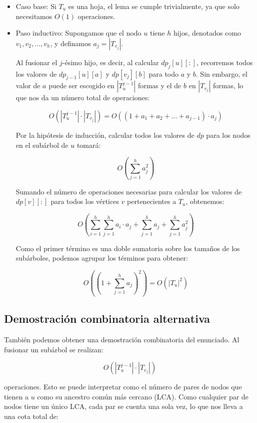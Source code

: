 \begin{itemize}
    \item Caso base: Si $T_u$ es una hoja, el lema se cumple trivialmente, ya que solo necesitamos $O(1)$ operaciones.
    \item Paso inductivo: Supongamos que el nodo $u$ tiene $h$ hijos, denotados como $v_1, v_2, \dots, v_h$, y definamos $a_j = |T_{v_j}|$.
    
    Al fusionar el $j$-ésimo hijo, es decir, al calcular $dp_j[u][:]$, recorremos todos los valores de $dp_{j-1}[u][a]$ y 
    $dp[v_j][b]$ para todo $a$ y $b$. Sin embargo, el valor de $a$ puede ser escogido en $|T_u^{j-1}|$ formas y el de $b$ en 
    $|T_{v_j}|$ formas, lo que nos da un número total de operaciones:

    \[
    O(|T_u^{j-1}| \cdot |T_{v_j}|) = O\left( (1 + a_1 + a_2 + \dots + a_{j-1}) \cdot a_j \right)
    \]

    Por la hipótesis de inducción, calcular todos los valores de $dp$ para los nodos en el subárbol de $u$ tomará:

    \[
    O\left( \sum_{j=1}^{h} a_j^2 \right)
    \]

    Sumando el número de operaciones necesarias para calcular los valores de $dp[v][:]$ para todos los vértices $v$ pertenecientes a $T_u$, obtenemos:

    \[
    O\left( \sum_{i=1}^{h} \sum_{j=1}^{h} a_i \cdot a_j + \sum_{j=1}^{h} a_j + \sum_{j=1}^{h} a_j^2 \right)
    \]

    Como el primer término es una doble sumatoria sobre los tamaños de los subárboles, podemos agrupar los términos para obtener:

    \[
    O\left( \left( 1 + \sum_{j=1}^{h} a_j \right)^2 \right) = O(|T_u|^2)
    \]

\end{itemize}

\subsection{Demostración combinatoria alternativa}

También podemos obtener una demostración combinatoria del enunciado. Al fusionar un subárbol se realizan:

\[
O(|T_u^{j-1}| \cdot |T_{v_j}|)
\]

operaciones. Esto se puede interpretar como el número de pares de nodos que tienen a $u$ como su ancestro común más cercano (LCA).
Como cualquier par de nodos tiene un único LCA, cada par se cuenta una sola vez, lo que nos lleva a una cota total de:

